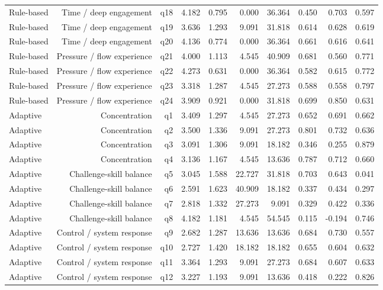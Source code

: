\documentclass[10pt]{article}
\begin{document}
{\begin{longtable}{lrrrrrrrrr}
Rule-based & Time / deep engagement & q18 & 4.182 & 0.795 & 0.000 & 36.364 & 0.450 & 0.703 & 0.597 \\
Rule-based & Time / deep engagement & q19 & 3.636 & 1.293 & 9.091 & 31.818 & 0.614 & 0.628 & 0.619 \\
Rule-based & Time / deep engagement & q20 & 4.136 & 0.774 & 0.000 & 36.364 & 0.661 & 0.616 & 0.641 \\
Rule-based & Pressure / flow experience & q21 & 4.000 & 1.113 & 4.545 & 40.909 & 0.681 & 0.560 & 0.771 \\
Rule-based & Pressure / flow experience & q22 & 4.273 & 0.631 & 0.000 & 36.364 & 0.582 & 0.615 & 0.772 \\
Rule-based & Pressure / flow experience & q23 & 3.318 & 1.287 & 4.545 & 27.273 & 0.588 & 0.558 & 0.797 \\
Rule-based & Pressure / flow experience & q24 & 3.909 & 0.921 & 0.000 & 31.818 & 0.699 & 0.850 & 0.631 \\
Adaptive & Concentration & q1 & 3.409 & 1.297 & 4.545 & 27.273 & 0.652 & 0.691 & 0.662 \\
Adaptive & Concentration & q2 & 3.500 & 1.336 & 9.091 & 27.273 & 0.801 & 0.732 & 0.636 \\
Adaptive & Concentration & q3 & 3.091 & 1.306 & 9.091 & 18.182 & 0.346 & 0.255 & 0.879 \\
Adaptive & Concentration & q4 & 3.136 & 1.167 & 4.545 & 13.636 & 0.787 & 0.712 & 0.660 \\
Adaptive & Challenge-skill balance & q5 & 3.045 & 1.588 & 22.727 & 31.818 & 0.703 & 0.643 & 0.041 \\
Adaptive & Challenge-skill balance & q6 & 2.591 & 1.623 & 40.909 & 18.182 & 0.337 & 0.434 & 0.297 \\
Adaptive & Challenge-skill balance & q7 & 2.818 & 1.332 & 27.273 & 9.091 & 0.329 & 0.422 & 0.336 \\
Adaptive & Challenge-skill balance & q8 & 4.182 & 1.181 & 4.545 & 54.545 & 0.115 & -0.194 & 0.746 \\
Adaptive & Control / system response & q9 & 2.682 & 1.287 & 13.636 & 13.636 & 0.684 & 0.730 & 0.557 \\
Adaptive & Control / system response & q10 & 2.727 & 1.420 & 18.182 & 18.182 & 0.655 & 0.604 & 0.632 \\
Adaptive & Control / system response & q11 & 3.364 & 1.293 & 9.091 & 27.273 & 0.684 & 0.607 & 0.633 \\
Adaptive & Control / system response & q12 & 3.227 & 1.193 & 9.091 & 13.636 & 0.418 & 0.222 & 0.826 \\

\end{longtable}}
\end{document}
